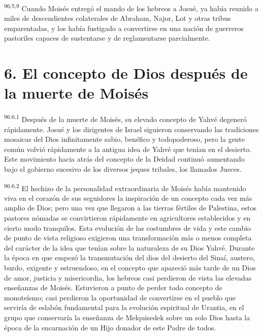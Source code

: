 \par
\textsuperscript{96:5.9} Cuando Moisés entregó el mando de los hebreos a Josué, ya había reunido a miles de descendientes colaterales de Abraham, Najor, Lot y otras tribus emparentadas, y los había fustigado a convertirse en una nación de guerreros pastoriles capaces de sustentarse y de reglamentarse parcialmente.

\section*{6. El concepto de Dios después de la muerte de Moisés}
\par
\textsuperscript{96:6.1} Después de la muerte de Moisés, su elevado concepto de Yahvé degeneró rápidamente. Josué y los dirigentes de Israel siguieron conservando las tradiciones mosaicas del Dios infinitamente sabio, benéfico y todopoderoso, pero la gente común volvió rápidamente a la antigua idea de Yahvé que tenían en el desierto. Este movimiento hacia atrás del concepto de la Deidad continuó aumentando bajo el gobierno sucesivo de los diversos jeques tribales, los llamados Jueces.

\par
\textsuperscript{96:6.2} El hechizo de la personalidad extraordinaria de Moisés había mantenido viva en el corazón de sus seguidores la inspiración de un concepto cada vez más amplio de Dios; pero una vez que llegaron a las tierras fértiles de Palestina, estos pastores nómadas se convirtieron rápidamente en agricultores establecidos y en cierto modo tranquilos. Esta evolución de las costumbres de vida y este cambio de punto de vista religioso exigieron una transformación más o menos completa del carácter de la idea que tenían sobre la naturaleza de su Dios Yahvé. Durante la época en que empezó la transmutación del dios del desierto del Sinaí, austero, burdo, exigente y estruendoso, en el concepto que apareció más tarde de un Dios de amor, justicia y misericordia, los hebreos casi perdieron de vista las elevadas enseñanzas de Moisés. Estuvieron a punto de perder todo concepto de monoteísmo; casi perdieron la oportunidad de convertirse en el pueblo que serviría de eslabón fundamental para la evolución espiritual de Urantia, en el grupo que conservaría la enseñanza de Melquisedek sobre un solo Dios hasta la época de la encarnación de un Hijo donador de este Padre de todos.

